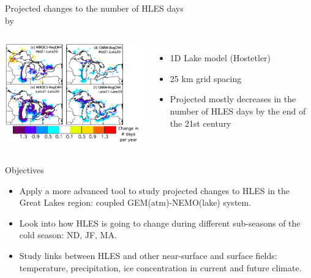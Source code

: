 \documentclass{beamer}
\begin{document}
  \begin{frame}{Projected changes to the number of HLES days\\ by~\citet{Notaro:2015}}
    \begin{columns}
        \includegraphics[height=0.6\textheight]{notaro_et_al_changes_to_hles_days.png}
        \begin{itemize}
          \item 1D Lake model (Hostetler)
          \item 25 km grid spacing
          \item Projected mostly decreases in the number of HLES days by the end of the 21st century
        \end{itemize}

    \end{columns}
  \end{frame}

  \begin{frame}{Objectives}
    \begin{itemize}
      \item Apply a more advanced tool to study projected changes to HLES in the Great Lakes region: coupled GEM(atm)-NEMO(lake) system.
      \item Look into how HLES is going to change during different sub-seasons of the cold season: ND, JF, MA.
      \item Study links between HLES and other near-surface and surface fields: temperature, precipitation, ice concentration in current and future climate.
    \end{itemize}
  \end{frame}
\end{document}
